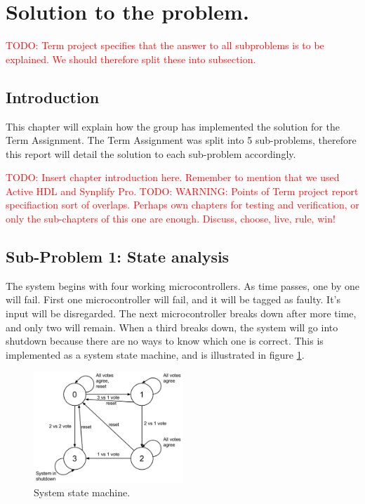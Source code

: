 \documentclass[a4paper]{IEEEtran}
\newcommand\TODO[1]{\textcolor{red}{TODO:#1}}
\newcommand\todo[1]{\TODO{#1}}
\begin{document}
\section{ Solution to the problem.}
\todo{ Term project specifies that the answer to all subproblems is to be explained. We should therefore split these into subsection. }
\subsection{Introduction}
This chapter will explain how the group has implemented the solution for the Term Assignment.
The Term Assignment was split into 5 sub-problems, therefore this report will detail the solution to each sub-problem accordingly.

\todo{ Insert chapter introduction here. Remember to mention that we used Active HDL and Synplify Pro.}
\todo{ WARNING: Points of Term project report specifiaction sort of overlaps. Perhaps own chapters for testing and verification, or only the sub-chapters of this one are enough. Discuss, choose, live, rule, win!} 

\subsection{Sub-Problem 1: State analysis}

The system begins with four working microcontrollers.
As time passes, one by one will fail.
First one microcontroller will fail, and it will be tagged as faulty.
It's input will be disregarded.
The next microcontroller breaks down after more time, and only two will remain.
When a third breaks down, the system will go into shutdown because there are no ways to know which one is correct.
This is implemented as a system state machine, and is illustrated in figure \ref{fig:StateMachine}.
\begin{figure}[h!]
    \centering
    \includegraphics[width=0.5\textwidth]{Figures/Solution/StateMachine}
    \caption{System state machine.}
    \label{fig:StateMachine}
\end{figure}
\end{document}
